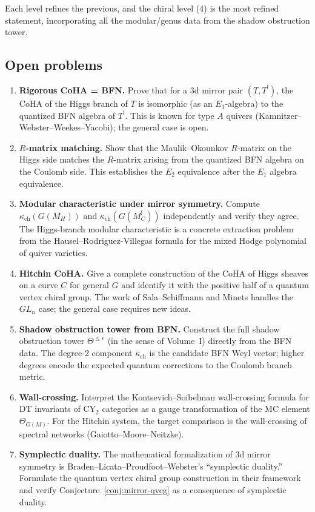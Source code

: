 \documentclass[11pt]{article}
\theoremstyle{definition}
\theoremstyle{remark}
\newcommand{\CY}{\mathrm{CY}}
\newcommand{\Eone}{E_1}
\newcommand{\Etwo}{E_2}
\begin{document}
Each level refines the previous, and the chiral level (4) is the most refined statement, incorporating all the modular/genus data from the shadow obstruction tower.

\subsection{Open problems}

\begin{enumerate}[label=\textbf{P\arabic*.}]
 \item \textbf{Rigorous CoHA = BFN.} Prove that for a 3d mirror pair $(T, T^!)$, the CoHA of the Higgs branch of $T$ is isomorphic (as an $\Eone$-algebra) to the quantized BFN algebra of $T^!$. This is known for type $A$ quivers (Kamnitzer--Webster--Weekes--Yacobi); the general case is open.

 \item \textbf{$R$-matrix matching.} Show that the Maulik--Okounkov $R$-matrix on the Higgs side matches the $R$-matrix arising from the quantized BFN algebra on the Coulomb side. This establishes the $\Etwo$ equivalence after the $\Eone$ algebra equivalence.

 \item \textbf{Modular characteristic under mirror symmetry.} Compute $\kappa_{\mathrm{ch}}(G(M_H))$ and $\kappa_{\mathrm{ch}}(G(M_C^!))$ independently and verify they agree. The Higgs-branch modular characteristic is a concrete extraction problem from the Hausel--Rodriguez-Villegas formula for the mixed Hodge polynomial of quiver varieties.

 \item \textbf{Hitchin CoHA.} Give a complete construction of the CoHA of Higgs sheaves on a curve $C$ for general $G$ and identify it with the positive half of a quantum vertex chiral group. The work of Sala--Schiffmann and Minets handles the $GL_n$ case; the general case requires new ideas.

 \item \textbf{Shadow obstruction tower from BFN.} Construct the full shadow obstruction tower $\Theta^{\leq r}$ (in the sense of Volume~I) directly from the BFN data. The degree-2 component $\kappa_{\mathrm{ch}}$ is the candidate BFN Weyl vector; higher degrees encode the expected quantum corrections to the Coulomb branch metric.

 \item \textbf{Wall-crossing.} Interpret the Kontsevich--Soibelman wall-crossing formula for DT invariants of $\CY_2$ categories as a gauge transformation of the MC element $\Theta_{G(M)}$. For the Hitchin system, the target comparison is the wall-crossing of spectral networks (Gaiotto--Moore--Neitzke).

 \item \textbf{Symplectic duality.} The mathematical formalization of 3d mirror symmetry is Braden--Licata--Proudfoot--Webster's ``symplectic duality.'' Formulate the quantum vertex chiral group construction in their framework and verify Conjecture~\ref{conj:mirror-qvcg} as a consequence of symplectic duality.
\end{enumerate}
\end{document}

